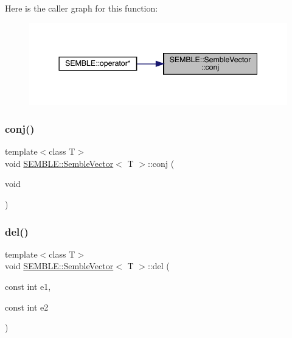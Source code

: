 Here is the caller graph for this function\+:
\nopagebreak
\begin{figure}[H]
\begin{center}
\leavevmode
\includegraphics[width=344pt]{d9/d94/structSEMBLE_1_1SembleVector_a82e42a0a34e836f565f54273df6e5e59_icgraph}
\end{center}
\end{figure}
\mbox{\label{structSEMBLE_1_1SembleVector_a82e42a0a34e836f565f54273df6e5e59}} 
\subsubsection{\texorpdfstring{conj()}{conj()}\hspace{0.1cm}{\footnotesize\ttfamily [2/2]}}
{\footnotesize\ttfamily template$<$class T$>$ \\
void \mbox{\hyperlink{structSEMBLE_1_1SembleVector}{S\+E\+M\+B\+L\+E\+::\+Semble\+Vector}}$<$ T $>$\+::conj (\begin{DoxyParamCaption}\item[{void}]{ }\end{DoxyParamCaption})}

\mbox{\label{structSEMBLE_1_1SembleVector_a50da934be7c3c32c09b2ab8454a9c1b5}} 
\subsubsection{\texorpdfstring{del()}{del()}\hspace{0.1cm}{\footnotesize\ttfamily [1/2]}}
{\footnotesize\ttfamily template$<$class T$>$ \\
void \mbox{\hyperlink{structSEMBLE_1_1SembleVector}{S\+E\+M\+B\+L\+E\+::\+Semble\+Vector}}$<$ T $>$\+::del (\begin{DoxyParamCaption}\item[{const int}]{e1,  }\item[{const int}]{e2 }\end{DoxyParamCaption})}

